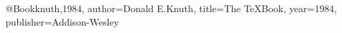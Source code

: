 @Book{knuth,1984,
author={Donald E.Knuth},
title={The \TeX Book},
year={1984},
publisher={Addison-Wesley}
}